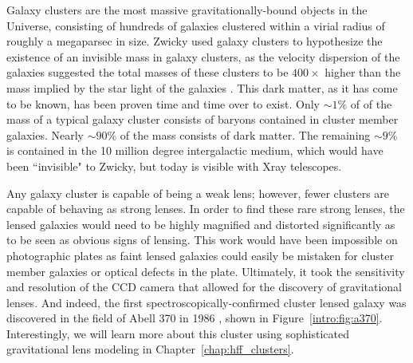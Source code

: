 Galaxy clusters are the most massive gravitationally-bound objects in the Universe, consisting of hundreds of galaxies clustered within a virial radius of roughly a megaparsec in size. Zwicky used galaxy clusters to hypothesize the existence of an invisible mass in galaxy clusters, as the velocity dispersion of the galaxies suggested the total masses of these clusters to be $400\times$ higher than the mass implied by the star light of the galaxies \citep{Zwicky:1937yq}. This dark matter, as it has come to be known, has been proven time and time over to exist. Only $\sim1\%$ of of the mass of a typical galaxy cluster consists of baryons contained in cluster member galaxies. Nearly $\sim90\%$ of the mass consists of dark matter. The remaining $\sim9\%$ is contained in the 10 million degree intergalactic medium, which would have been ``invisible" to Zwicky, but today is visible with Xray telescopes.

Any galaxy cluster is capable of being a weak lens; however, fewer clusters are capable of behaving as strong lenses.  In order to find these rare strong lenses, the lensed galaxies would need to be highly magnified and distorted significantly as to be seen as obvious signs of lensing. This work would have been impossible on photographic plates as faint lensed galaxies could easily be mistaken for cluster member galaxies or optical defects in the plate. Ultimately, it took the sensitivity and resolution of the CCD camera that allowed for the discovery of gravitational lenses. And indeed, the first spectroscopically-confirmed cluster lensed galaxy was discovered in the field of Abell 370 in 1986 \citep{Soucail:1988kx,Soucail:1987sf,Soucail:1987rz}, shown in Figure~\ref{intro:fig:a370}. Interestingly, we will learn more about this cluster using sophisticated gravitational lens modeling in Chapter~\ref{chap:hff_clusters}.

